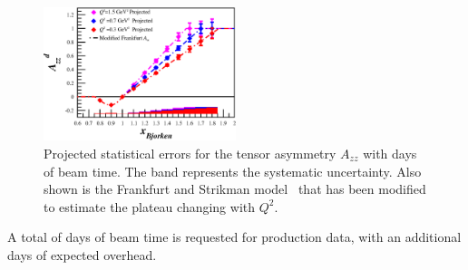 \begin{figure}
\begin{center}
\includegraphics[width=0.5\textwidth]{figs/Pzz_30_Azz_combo.eps} 
\caption{\label{PROJ}Projected statistical errors for the tensor asymmetry $A_{zz}$ with \productiondays days of beam time. The band represents the systematic uncertainty. Also shown is the Frankfurt and Strikman model~\cite{Frankfurt:1988nt} that has been modified to estimate the plateau changing with $Q^2$.
}
\end{center}
\end{figure}

A total of 
\productiondays
 days of beam time is requested for production data, with an additional \overheaddays days of expected overhead.



\clearpage

%





